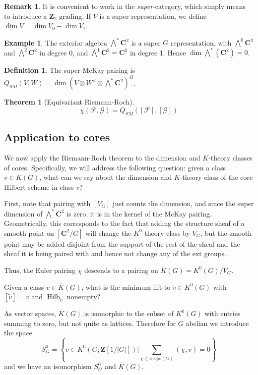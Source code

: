 \documentclass{amsart}[12pt]
\theoremstyle{definition}
\newtheorem{theorem}[dummy]{Theorem}
\newtheorem{example}[dummy]{Example}
\newtheorem{definition}[dummy]{Definition}
\newtheorem{remark}[dummy]{Remark}
\newcommand{\Z}{\mathbf{Z}}
\newcommand{\C}{\mathbf{C}}
\newcommand{\irreps}{\text{irreps}}
\DeclareMathOperator{\Hilb}{Hilb}
\begin{document}
\begin{remark}
It is convenient to work in the \emph{super}-category, which simply means to introduce a $\Z_2$ grading.  If $V$ is a super representation, we define $\dim V=\dim V_0-\dim V_1$.

\begin{example} 
The exterior algebra $\bigwedge^*\C^2$ is a super $G$ representation, with $\bigwedge^0\C^2$ and $\bigwedge^2\C^2$ in degree 0, and $\bigwedge^1\C^2=\C^2$ in degree 1.  Hence $\dim \bigwedge^*(\C^2)=0$.
\end{example}

\begin{definition}
The super McKay pairing is $Q_{SM}(V,W)=\dim (V\otimes W^\vee\otimes\bigwedge^*\C^2)^G$.
\end{definition}


\begin{theorem}[Equivariant Riemann-Roch]
$$\chi(\mathcal{F},\mathcal{G})=Q_{SM}([\mathcal{F}],[\mathcal{G}])$$
\end{theorem}


\subsection{Application to cores}

We now apply the Riemann-Roch theorem to the dimension and $K$-theory classes of cores.  Specifically, we will address the following question: given a class $v\in \overline{K}(G)$, what can we say about the dimension and $K$-theory class of the core Hilbert scheme in class $v$?

First, note that pairing with $[V_G]$ just counts the dimension, and since the super dimension of $\bigwedge^*\C^2$ is zero, it is in the kernel of the McKay pairing.  Geometrically, this corresponds to the fact that adding the structure sheaf of a smooth point on $[\C^2/G]$ will change the $K^0$ theory class by $V_G$, but the smooth point may be added disjoint from the support of the rest of the sheaf and the sheaf it is being paired with and hence not change any of the ext groups.


Thus, the Euler pairing $\chi$ descends to a pairing on $\overline{K}(G)=K^0(G)/V_G$.

Given a class $v\in \overline{K}(G)$, what is the minimum lift to $\tilde{v}\in K^0(G)$ with $[\tilde{v}]=v$ and $\Hilb_{\tilde{v}}$ nonempty?

As vector spaces, $\overline{K}(G)$ is isomorphic to the subset of $K^0(G)$ with entries summing to zero, but not quite as lattices.  Therefore for $G$ abelian we introduce the space 
$$S^0_G=\left\{v\in K^0(G; \Z[1/|G|])\Bigg | \sum_{\chi\in\irreps(G)}(\chi, v)=0\right\}$$
and we have an isomorphism $S^0_G$ and $\overline{K}(G)$.  



\end{remark}
\end{document}

